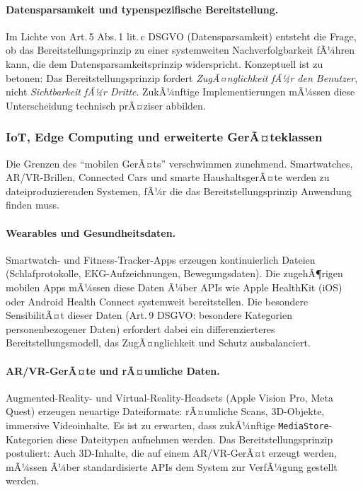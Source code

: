 ﻿\documentclass[12pt, a4paper]{article}
\begin{document}
\paragraph{Datensparsamkeit und typenspezifische Bereitstellung.}
Im Lichte von Art.\,5 Abs.\,1 lit.\,c DSGVO (Datensparsamkeit) entsteht die Frage, ob
das Bereitstellungsprinzip zu einer systemweiten Nachverfolgbarkeit fÃ¼hren kann, die dem
Datensparsamkeitsprinzip widerspricht. Konzeptuell ist zu betonen: Das Bereitstellungsprinzip
fordert \emph{ZugÃ¤nglichkeit fÃ¼r den Benutzer}, nicht \emph{Sichtbarkeit fÃ¼r Dritte}.
ZukÃ¼nftige Implementierungen mÃ¼ssen diese Unterscheidung technisch prÃ¤ziser abbilden.

\subsubsection{IoT, Edge Computing und erweiterte GerÃ¤teklassen}

Die Grenzen des \enquote{mobilen GerÃ¤ts} verschwimmen zunehmend. Smartwatches,
AR/VR-Brillen, Connected Cars und smarte HaushaltsgerÃ¤te werden zu dateiproduzierenden
Systemen, fÃ¼r die das Bereitstellungsprinzip Anwendung finden muss.

\paragraph{Wearables und Gesundheitsdaten.}
Smartwatch- und Fitness-Tracker-Apps erzeugen kontinuierlich Dateien (Schlafprotokolle,
EKG-Aufzeichnungen, Bewegungsdaten). Die zugehÃ¶rigen mobilen Apps mÃ¼ssen diese Daten
Ã¼ber APIs wie Apple HealthKit (iOS) oder Android Health Connect systemweit bereitstellen.
Die besondere SensibilitÃ¤t dieser Daten (Art.\,9 DSGVO: besondere Kategorien
personenbezogener Daten) erfordert dabei ein differenzierteres Bereitstellungsmodell,
das ZugÃ¤nglichkeit und Schutz ausbalanciert.

\paragraph{AR/VR-GerÃ¤te und rÃ¤umliche Daten.}
Augmented-Reality- und Virtual-Reality-Headsets (Apple Vision Pro, Meta Quest) erzeugen
neuartige Dateiformate: rÃ¤umliche Scans, 3D-Objekte, immersive Videoinhalte. Es ist zu
erwarten, dass zukÃ¼nftige \texttt{MediaStore}-Kategorien diese Dateitypen aufnehmen
werden. Das Bereitstellungsprinzip postuliert: Auch 3D-Inhalte, die auf einem
AR/VR-GerÃ¤t erzeugt werden, mÃ¼ssen Ã¼ber standardisierte APIs dem System zur VerfÃ¼gung
gestellt werden.
\end{document}
